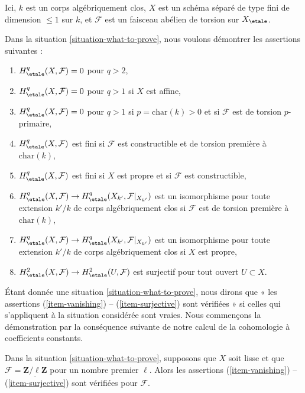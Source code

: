 \begin{situation}
\label{situation-what-to-prove}
Ici, $k$ est un corps algébriquement clos, $X$ est un schéma séparé de type fini
de dimension $\leq 1$ sur $k$, et $\mathcal{F}$ est un faisceau abélien
de torsion sur $X_\etale$.
\end{situation}

\noindent
Dans la situation \ref{situation-what-to-prove},
nous voulons démontrer les assertions suivantes :
\begin{enumerate}
\item
\label{item-vanishing}
$H^q_\etale(X, \mathcal{F}) = 0$ pour $q > 2$,
\item
\label{item-vanishing-affine}
$H^q_\etale(X, \mathcal{F}) = 0$ pour $q > 1$ si $X$ est affine,
\item
\label{item-vanishing-p-p}
$H^q_\etale(X, \mathcal{F}) = 0$ pour $q > 1$ si $p = \text{char}(k) > 0$
et si $\mathcal{F}$ est de torsion $p$-primaire,
\item
\label{item-finite-prime-to-p}
$H^q_\etale(X, \mathcal{F})$ est fini si $\mathcal{F}$ est constructible
et de torsion première à $\text{char}(k)$,
\item
\label{item-finite-proper}
$H^q_\etale(X, \mathcal{F})$ est fini si $X$ est propre et si
$\mathcal{F}$ est constructible,
\item
\label{item-base-change-prime-to-p}
$H^q_\etale(X, \mathcal{F}) \to
H^q_\etale(X_{k'}, \mathcal{F}|_{X_{k'}})$ est un isomorphisme
pour toute extension $k'/k$ de corps algébriquement clos
si $\mathcal{F}$ est de torsion première à $\text{char}(k)$,
\item
\label{item-base-change-proper}
$H^q_\etale(X, \mathcal{F}) \to
H^q_\etale(X_{k'}, \mathcal{F}|_{X_{k'}})$ est un isomorphisme
pour toute extension $k'/k$ de corps algébriquement clos
si $X$ est propre,
\item
\label{item-surjective}
$H^2_\etale(X, \mathcal{F}) \to H^2_\etale(U, \mathcal{F})$
est surjectif pour tout ouvert $U \subset X$.
\end{enumerate}
Étant donnée une situation \ref{situation-what-to-prove},
nous dirons que
« les assertions (\ref{item-vanishing}) -- (\ref{item-surjective}) sont vérifiées »
si celles qui s'appliquent à la situation considérée sont vraies.
Nous commençons la démonstration par la conséquence suivante de notre calcul
de la cohomologie à coefficients constants.

\begin{lemma}
\label{lemma-constant-smooth-statements}
Dans la situation \ref{situation-what-to-prove},
supposons que $X$ soit lisse et que $\mathcal{F} = \underline{\mathbf{Z}/\ell\mathbf{Z}}$
pour un nombre premier $\ell$. Alors les assertions
(\ref{item-vanishing}) -- (\ref{item-surjective}) sont vérifiées
pour $\mathcal{F}$.
\end{lemma}

